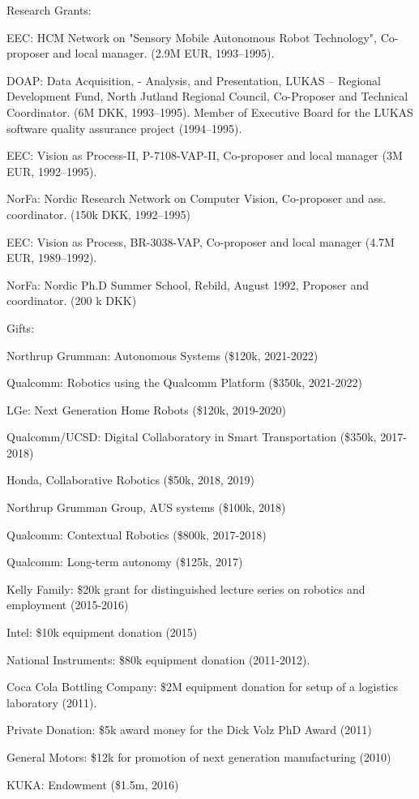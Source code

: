\documentclass{article}
\begin{document}
\begin{cv}
\begin{cvlist}{Research Grants:}
\item EEC: HCM Network on "Sensory Mobile Autonomous Robot
  Technology", Co-proposer and local manager.  (2.9M EUR,
  1993--1995).%
\item DOAP: Data Acquisition, - Analysis, and Presentation, LUKAS --
  Regional Development Fund, North Jutland Regional Council,
  Co-Proposer and Technical Coordinator. (6M DKK, 1993--1995). Member
  of  Executive Board for the LUKAS software quality assurance project
  (1994--1995).%
\item EEC: Vision as Process-II, P-7108-VAP-II, Co-proposer and local
  manager (3M EUR, 1992--1995).%
\item NorFa: Nordic Research Network on Computer Vision, Co-proposer
  and ass. coordinator.  (150k DKK, 1992--1995)%
\item EEC: Vision as Process, BR-3038-VAP, Co-proposer and local
  manager (4.7M EUR, 1989--1992).%
\item NorFa: Nordic Ph.D Summer School, Rebild, August 1992, Proposer
  and coordinator. (200 k DKK)%
\end{cvlist}

\begin{cvlist}{Gifts:}
\item Northrup Grumman: Autonomous Systems (\$120k, 2021-2022)
\item Qualcomm: Robotics using the Qualcomm Platform (\$350k, 2021-2022)
\item LGe: Next Generation Home Robots (\$120k, 2019-2020)
\item Qualcomm/UCSD: Digital Collaboratory in Smart Transportation
  (\$350k, 2017-2018)
\item Honda, Collaborative Robotics (\$50k, 2018, 2019)
\item Northrup Grumman Group, AUS systems (\$100k, 2018)
\item Qualcomm: Contextual Robotics (\$800k, 2017-2018)
\item Qualcomm: Long-term autonomy (\$125k, 2017)
\item Kelly Family: \$20k grant for distinguished lecture series on
  robotics and employment (2015-2016)
\item Intel: \$10k equipment donation (2015)
\item National Instruments: \$80k equipment donation (2011-2012).
\item Coca Cola Bottling Company: \$2M equipment donation for setup of
  a logistics laboratory (2011).
\item Private Donation: \$5k award money for the Dick Volz PhD Award
  (2011)
\item General Motors: \$12k for promotion of next generation
  manufacturing (2010)
\item KUKA: Endowment (\$1.5m, 2016)
\end{cvlist}


\end{cv}
\end{document}
